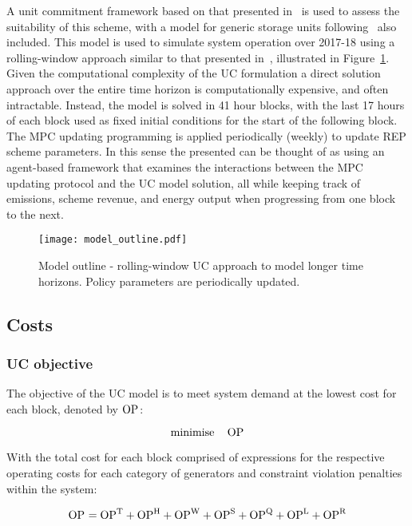 \documentclass{article}
\DeclareMathOperator*{\minimise}{minimise}
\begin{document}
A unit commitment framework based on that presented in~\cite{morales-espana_tight_2015} is used to assess the suitability of this scheme, with a model for generic storage units following~\cite{pozo_unit_2014} also included. This model is used to simulate system operation over 2017-18 using a rolling-window approach similar to that presented in~\cite{riaz_computationally_2019-1}, illustrated in Figure~\ref{fig: model outline}. Given the computational complexity of the UC formulation a direct solution approach over the entire time horizon is computationally expensive, and often intractable. Instead, the model is solved in 41 hour blocks, with the last 17 hours of each block used as fixed initial conditions for the start of the following block. The MPC updating programming is applied periodically (weekly) to update REP scheme parameters. In this sense the presented can be thought of as using an agent-based framework that examines the interactions between the MPC updating protocol and the UC model solution, all while keeping track of emissions, scheme revenue, and energy output when progressing from one block to the next.

\begin{figure}
	\texttt{[image: model\_outline.pdf]}
	\caption{Model outline - rolling-window UC approach to model longer time horizons. Policy parameters are periodically updated.}
	\label{fig: model outline}
\end{figure}

\subsection{Costs}

\subsubsection{UC objective}
The objective of the UC model is to meet system demand at the lowest cost for each block, denoted by $\mathrm{OP}_{}$:

\begin{equation}
	\minimise \quad \cOperatingCost
	\label{eqn: uc objective}
\end{equation}

With the total cost for each block comprised of expressions for the respective operating costs for each category of generators and constraint violation penalties within the system:

\begin{equation}
\mathrm{OP}_{} = \mathrm{OP}^{\mathrm{T}}_{} + \mathrm{OP}^{\mathrm{H}}_{} + \mathrm{OP}^{\mathrm{W}}_{} + \mathrm{OP}^{\mathrm{S}}_{} + \mathrm{OP}^{\mathrm{Q}}_{} + \mathrm{OP}^{\mathrm{L}}_{} + \mathrm{OP}^{\mathrm{R}}_{}
\end{equation}
\end{document}
